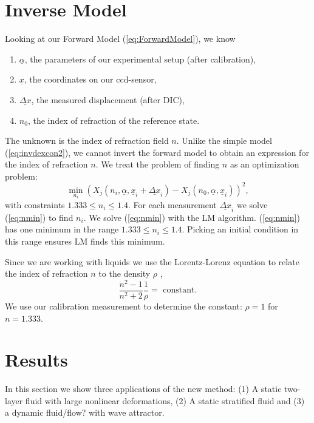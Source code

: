 \documentclass[draft]{svjour3}                     %
\begin{document}
\section{Inverse Model}
\label{sec:invmod}
Looking at our Forward Model (\ref{eq:ForwardModel}), we know
\begin{enumerate}
	\item $\underline{\alpha}$, the parameters of our experimental setup (after calibration), 
	\item $\underline{x}$, the coordinates on our ccd-sensor, 
	\item $\underline{\Delta x}$, the measured displacement (after DIC), 
	\item $n_0$, the index of refraction of the reference state.
\end{enumerate}
The unknown is the index of refraction field $n$. Unlike the simple model (\ref{eq:invdexcon2}), we cannot invert the forward model to obtain an expression for the index of refraction $n$. We treat the problem of finding $n$ as an optimization problem:
\begin{equation}
\label{eq:nmin} 
	\min_{n_i} (X_{j}(n_i, \underline{\alpha}, \underline{x}_i+\underline{\Delta x}_i) - X_{j}(n_0, \underline{\alpha}, \underline{x}_i))^2, 
\end{equation}
with constraints $1.333 \leq n_i \leq 1.4$. For each measurement $\underline{\Delta x}_i$ we solve (\ref{eq:nmin}) to find $n_i$. We solve (\ref{eq:nmin}) with the LM algorithm. (\ref{eq:nmin}) has one minimum in the range $1.333 \leq n_i \leq 1.4$. Picking an initial condition in this range ensures LM finds this minimum.

Since we are working with liquids we use the Lorentz-Lorenz equation to relate the index of refraction $n$ to the density $\rho$ \cite{lorentz1916theory, tan2015dependence},
\begin{equation}
 	\frac{n^2-1}{n^2+2} \frac{1}{\rho} = \mbox{ constant}.
\end{equation}
We use our calibration measurement to determine the constant: $\rho=1$ for $n=1.333$.
\section{Results}
In this section we show three applications of the new method: (1) A static two-layer fluid with large nonlinear deformations, (2) A static stratified fluid and (3) a dynamic fluid/flow? with wave attractor.
\end{document}
